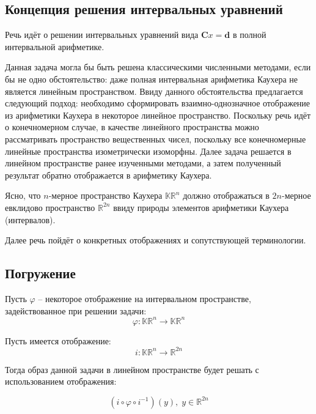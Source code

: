 \subsection{Концепция решения интервальных уравнений}

Речь идёт о решении интервальных уравнений вида $\mathbf{C}x = \mathbf{d}$ в полной интервальной арифметике.

Данная задача могла бы быть решена классическими численными методами, если бы не одно обстоятельство: даже полная интервальная арифметика Каухера не является линейным пространством. Ввиду данного обстоятельства предлагается следующий подход: необходимо сформировать взаимно-однозначное отображение из арифметики Каухера в некоторое линейное пространство. Поскольку речь идёт о конечномерном случае, в качестве линейного пространства можно рассматривать пространство вещественных чисел, поскольку все конечномерные линейные пространства изометрически изоморфны.
Далее задача решается в линейном пространстве ранее изученными методами, а затем полученный результат обратно отображается в арифметику Каухера.

Ясно, что $n$-мерное пространство Каухера $\mathbb{KR}^n$ должно отображаться в $2n$-мерное евклидово пространство $\mathbb{R}^{2n}$ ввиду природы элементов арифметики Каухера (интервалов).

Далее речь пойдёт о конкретных отображениях и сопутствующей терминологии.

\subsection{Погружение}

Пусть $\varphi$ -- некоторое отображение на интервальном пространстве, задействованное при решении задачи:
\begin{equation}
\varphi: \mathbb{KR}^n \rightarrow \mathbb{KR}^n
\end{equation}

Пусть имеется отображение:
\begin{equation}
i: \mathbb{KR}^n \rightarrow \mathbb{R}^{2n}
\end{equation}

Тогда образ данной задачи в линейном пространстве будет решать с использованием отображения:

\begin{equation}
(i \circ \varphi \circ i^{-1})(y), \; y \in \mathbb{R}^{2n}
\end{equation}

